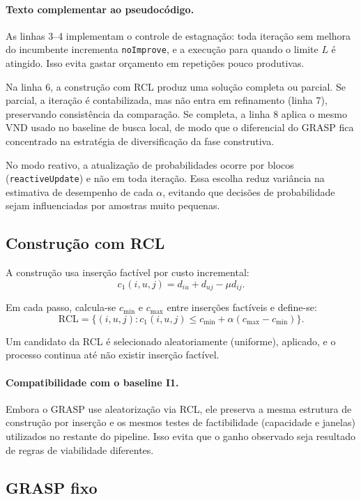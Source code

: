 \paragraph{Texto complementar ao pseudocódigo.}
As linhas 3--4 implementam o controle de estagnação: toda iteração sem melhora do incumbente incrementa \texttt{noImprove}, e a execução para quando o limite $L$ é atingido.
Isso evita gastar orçamento em repetições pouco produtivas.

Na linha 6, a construção com RCL produz uma solução completa ou parcial.
Se parcial, a iteração é contabilizada, mas não entra em refinamento (linha 7), preservando consistência da comparação.
Se completa, a linha 8 aplica o mesmo VND usado no baseline de busca local, de modo que o diferencial do GRASP fica concentrado na estratégia de diversificação da fase construtiva.

No modo reativo, a atualização de probabilidades ocorre por blocos (\texttt{reactiveUpdate}) e não em toda iteração.
Essa escolha reduz variância na estimativa de desempenho de cada $\alpha$, evitando que decisões de probabilidade sejam influenciadas por amostras muito pequenas.

\subsection{Construção com RCL}

A construção usa inserção factível por custo incremental:
\[
 c_1(i,u,j)=d_{iu}+d_{uj}-\mu d_{ij}.
\]

Em cada passo, calcula-se $c_{\min}$ e $c_{\max}$ entre inserções factíveis e define-se:
\[
 \text{RCL}=\{(i,u,j): c_1(i,u,j) \le c_{\min}+\alpha(c_{\max}-c_{\min})\}.
\]

Um candidato da RCL é selecionado aleatoriamente (uniforme), aplicado, e o processo continua até não existir inserção factível.

\paragraph{Compatibilidade com o baseline I1.}
Embora o GRASP use aleatorização via RCL, ele preserva a mesma estrutura de construção por inserção e os mesmos testes de factibilidade (capacidade e janelas) utilizados no restante do pipeline.
Isso evita que o ganho observado seja resultado de regras de viabilidade diferentes.

\subsection{GRASP fixo}

